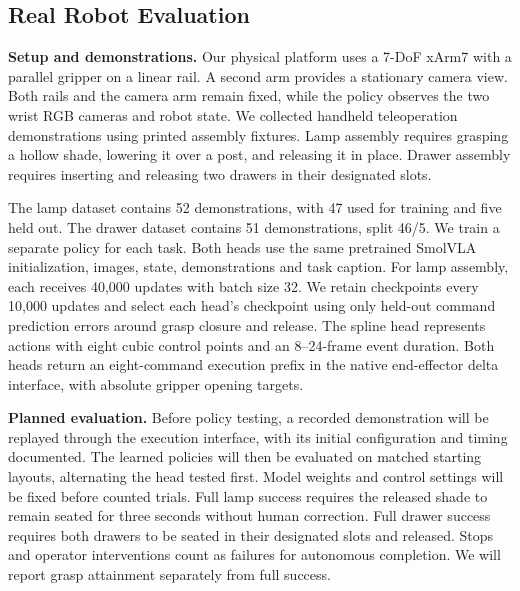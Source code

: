 \subsection{Real Robot Evaluation}
\label{sec:hardware}

\textbf{Setup and demonstrations.}
Our physical platform uses a 7-DoF xArm7 with a parallel gripper on a linear
rail. A second arm provides a stationary camera view. Both rails and the
camera arm remain fixed, while the policy observes the two wrist RGB cameras
and robot state. We collected handheld teleoperation demonstrations using
printed assembly fixtures. Lamp assembly requires grasping a hollow shade,
lowering it over a post, and releasing it in place. Drawer assembly requires
inserting and releasing two drawers in their designated slots.

The lamp dataset contains 52 demonstrations, with 47 used for training and
five held out. The drawer dataset contains 51 demonstrations, split 46/5.
We train a separate policy for each task. Both heads use the same pretrained
SmolVLA initialization, images, state, demonstrations and task caption. For
lamp assembly, each receives 40,000 updates with batch size 32. We retain
checkpoints every 10,000 updates and select each head's checkpoint using only
held-out command prediction errors around grasp closure and release.
The spline head represents actions with eight cubic control points and an
8--24-frame event duration. Both heads return an eight-command execution
prefix in the native end-effector delta interface, with absolute gripper
opening targets.

\textbf{Planned evaluation.}
Before policy testing, a recorded demonstration will be replayed through the
execution interface, with its initial configuration and timing documented.
The learned policies will then be evaluated on matched starting layouts,
alternating the head tested first. Model weights and control settings will
be fixed before counted trials. Full lamp success requires the released shade
to remain seated for three seconds without human correction. Full drawer
success requires both drawers to be seated in their designated slots and
released. Stops and operator interventions count as failures for autonomous
completion. We will report grasp attainment separately from full success.

